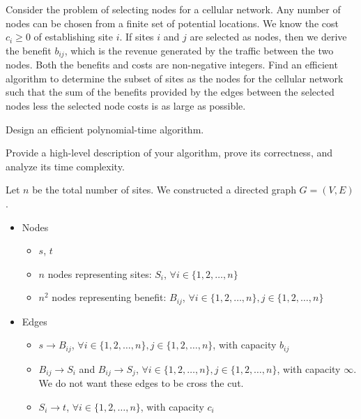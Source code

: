 \newpage
{} %

\problemdes

Consider the problem of selecting nodes for a cellular network. Any number of nodes can be chosen from a finite set of potential locations. We know the cost $c_i \ge 0$ of establishing site $i$. If sites $i$ and $j$ are selected as nodes, then we derive the benefit $b_{ij}$, which is the revenue generated by the traffic between the two nodes. Both the benefits and costs are non-negative integers. Find an efficient algorithm to determine the subset of sites as the nodes for the cellular network such that the sum of the benefits provided by the edges between the selected nodes less the selected node costs is as large as possible.

Design an efficient polynomial-time algorithm.

Provide a high-level description of your algorithm, prove its correctness, and analyze its time complexity.

\solution


Let $n$ be the total number of sites. We constructed a directed graph $G=(V,E)$.

\begin{itemize}
\item Nodes
	\begin{itemize}
		\item $s$, $t$
		\item $n$ nodes representing sites: $S_i$, $\forall i \in \{1, 2, \dots, n\}$
		\item $n^2$ nodes representing benefit: $B_{ij}$, $\forall i \in \{1, 2, \dots, n\}, j \in \{1, 2, \dots, n\}$
	\end{itemize}
\item Edges
	\begin{itemize}
		\item $s \rightarrow B_{ij}$, $\forall i \in \{1, 2, \dots, n\}, j \in \{1, 2, \dots, n\}$, with capacity $b_{ij}$
		\item $B_{ij} \rightarrow S_i$ and $B_{ij} \rightarrow S_j$, $\forall i \in \{1, 2, \dots, n\}, j \in \{1, 2, \dots, n\}$, with capacity $\infty$. We do not want these edges to be cross the cut.
		\item $S_i \rightarrow t$, $\forall i \in \{1, 2, \dots, n\}$, with capacity $c_i$
	\end{itemize}
\end{itemize}

